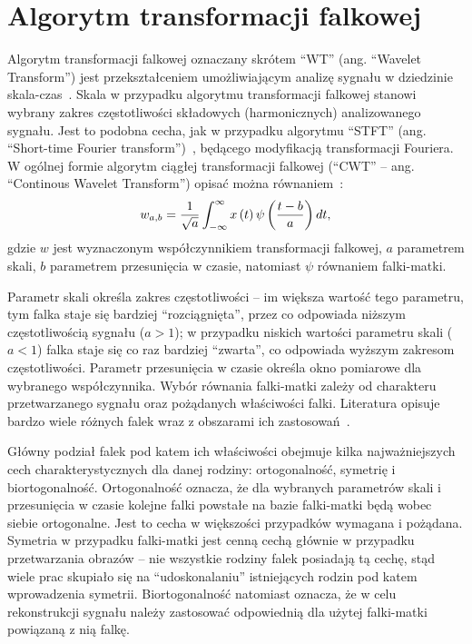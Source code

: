 \chapter{Algorytm transformacji falkowej}

Algorytm transformacji falkowej oznaczany skrótem \enquote{WT} (ang. \enquote{Wavelet Transform}) jest przekształceniem umożliwiającym analizę sygnału w dziedzinie skala-czas~\cite{wallen_handbook}. Skala w przypadku algorytmu transformacji falkowej stanowi wybrany zakres częstotliwości składowych (harmonicznych) analizowanego sygnału. Jest to podobna cecha, jak w przypadku algorytmu \enquote{STFT} (ang. \enquote{Short-time Fourier transform})~\cite{durak_sftp}, będącego modyfikacją transformacji Fouriera. W ogólnej formie algorytm ciągłej transformacji falkowej (\enquote{CWT} -- ang. \enquote{Continous Wavelet Transform}) opisać można równaniem~\cite{lord_guide, wallen_handbook}:
\begin{equation}
w_{a,b} = \frac{1}{\sqrt{a}} \int _{-\infty} ^{\infty} x \left(t\right) \psi \left(\frac{t-b}{a}\right) dt \label{eq:cwt},
\end{equation}
gdzie $w$ jest wyznaczonym współczynnikiem transformacji falkowej, $a$ parametrem skali, $b$ parametrem przesunięcia w czasie, natomiast $\psi$ równaniem falki-matki.

Parametr skali określa zakres częstotliwości -- im większa wartość tego parametru, tym falka staje się bardziej \enquote{rozciągnięta}, przez co odpowiada niższym częstotliwością sygnału ($a > 1$); w przypadku niskich wartości parametru skali ($a < 1$) falka staje się co raz bardziej \enquote{zwarta}, co odpowiada wyższym zakresom częstotliwości. Parametr przesunięcia w czasie określa okno pomiarowe dla wybranego współczynnika. Wybór równania falki-matki zależy od charakteru przetwarzanego sygnału oraz pożądanych właściwości falki. Literatura opisuje bardzo wiele różnych falek wraz z obszarami ich zastosowań~\cite{wallen_handbook, akujuobi_applications}.

Główny podział falek pod katem ich właściwości obejmuje kilka najważniejszych cech charakterystycznych dla danej rodziny: ortogonalność, symetrię i biortogonalność. Ortogonalność oznacza, że dla wybranych parametrów skali i przesunięcia w czasie kolejne falki powstałe na bazie falki-matki będą wobec siebie ortogonalne. Jest to cecha w większości przypadków wymagana i pożądana. Symetria w przypadku falki-matki jest cenną cechą głównie w przypadku przetwarzania obrazów -- nie wszystkie rodziny falek posiadają tą cechę, stąd wiele prac skupiało się na \enquote{udoskonalaniu} istniejących rodzin pod katem wprowadzenia symetrii. Biortogonalność natomiast oznacza, że w celu rekonstrukcji sygnału należy zastosować odpowiednią dla użytej falki-matki powiązaną z nią falkę.

